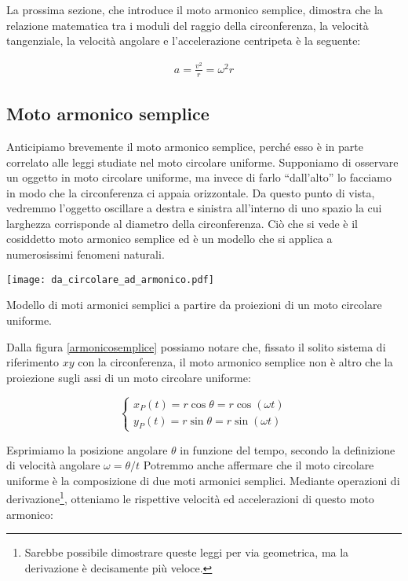 La prossima sezione, che introduce il moto armonico semplice, dimostra
che la relazione matematica tra i moduli del raggio della circonferenza,
la velocità tangenziale, la velocità angolare e l'accelerazione centripeta
è la seguente:

\begin{align}
    a = \frac{v^2}{r} = \omega^2 r
\end{align}


\subsection{Moto armonico semplice}
Anticipiamo brevemente il moto armonico semplice, perché esso è in
parte correlato alle leggi studiate nel moto circolare uniforme.
Supponiamo di osservare un oggetto in moto circolare uniforme, ma
invece di farlo ``dall'alto'' lo facciamo in modo che la circonferenza
ci appaia orizzontale. Da questo punto di vista, vedremmo l'oggetto
oscillare a destra e sinistra all'interno di uno spazio la cui
larghezza corrisponde al diametro della circonferenza. Ciò che si
vede è il cosiddetto moto armonico semplice ed è un modello che si
applica a numerosissimi fenomeni naturali.

\begin{marginfigure}
    \centering
    \texttt{[image: da\_circolare\_ad\_armonico.pdf]}
    \caption{Modello di moti armonici semplici a partire da proiezioni
    di un moto circolare uniforme.}
    \label{armonicosemplice}
\end{marginfigure}

Dalla figura \ref{armonicosemplice} possiamo notare che, fissato il solito sistema di riferimento
$xy$ con la circonferenza, il moto armonico semplice non è altro che la
proiezione sugli assi di un moto circolare uniforme:

\[
\begin{cases}
    x_P(t) = r\cos\theta = r\cos(\omega t)\\
    y_P(t) = r\sin\theta = r\sin(\omega t)
\end{cases}
\]

\noindent Esprimiamo la posizione angolare $\theta$ in funzione del
tempo, secondo la definizione di velocità angolare $\omega = \theta/t$
Potremmo anche affermare che il moto circolare uniforme è
la composizione di due moti armonici semplici. Mediante operazioni
di derivazione\footnote{Sarebbe possibile dimostrare queste leggi per
via geometrica, ma la derivazione è decisamente più veloce.}, otteniamo le rispettive velocità ed accelerazioni
di questo moto armonico:

